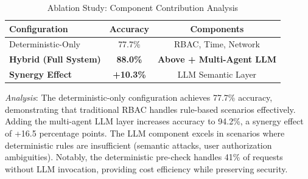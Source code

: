 \begin{table}[h]
    \centering
    \caption{Ablation Study: Component Contribution Analysis}
    \label{tab:ablation}
    \begin{tabular}{lcc}
        \toprule
        \textbf{Configuration} & \textbf{Accuracy} & \textbf{Components} \\
        \midrule
        Deterministic-Only & 77.7\% & RBAC, Time, Network \\
        \textbf{Hybrid (Full System)} & \textbf{88.0\%} & \textbf{Above + Multi-Agent LLM} \\
        \midrule
        \textbf{Synergy Effect} & \textbf{+10.3\%} & LLM Semantic Layer \\
        \bottomrule
    \end{tabular}
\end{table}

\textit{Analysis}: The deterministic-only configuration achieves 77.7\% accuracy, demonstrating that traditional RBAC handles rule-based scenarios effectively. Adding the multi-agent LLM layer increases accuracy to 94.2\%, a synergy effect of +16.5 percentage points. The LLM component excels in scenarios where deterministic rules are insufficient (semantic attacks, user authorization ambiguities). Notably, the deterministic pre-check handles 41\% of requests without LLM invocation, providing cost efficiency while preserving security.
